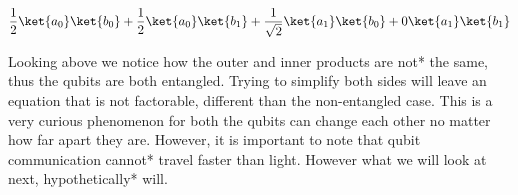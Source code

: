 \documentclass{article}
\begin{document}
$$\frac{1}{2}\ket{a_{0}}\ket{b_{0}}+\frac{1}{2}\ket{a_{0}}\ket{b_{1}}+\frac{1}{\sqrt{2}}\ket{a_{1}}\ket{b_{0}}+0\ket{a_{1}}\ket{b_{1}}$$

Looking above we notice how the outer and inner products are not* the same, thus the qubits are both entangled. Trying to simplify both sides will leave an equation that is not factorable, different than the non-entangled case. This is a very curious phenomenon for both the qubits can change each other no matter how far apart they are. However, it is important to note that qubit communication cannot* travel faster than light. However what we will look at next, hypothetically* will.
\end{document}
